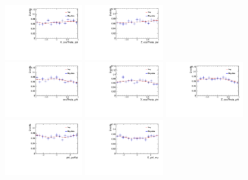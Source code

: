 \begin{figure}[!hbtp]
\includegraphics[width=0.3\textwidth]{Figures/03_Zcs/app_sideband/X_cosTheta_psi.pdf}%
\includegraphics[width=0.3\textwidth]{Figures/03_Zcs/app_sideband/Z_cosTheta_psi.pdf}\\
\includegraphics[width=0.3\textwidth]{Figures/03_Zcs/app_sideband/cosTheta_phi.pdf}%
\includegraphics[width=0.3\textwidth]{Figures/03_Zcs/app_sideband/X_cosTheta_phi.pdf}%
\includegraphics[width=0.3\textwidth]{Figures/03_Zcs/app_sideband/Z_cosTheta_phi.pdf}\\
\includegraphics[width=0.3\textwidth]{Figures/03_Zcs/app_sideband/phi_psiKst.pdf}%
\includegraphics[width=0.3\textwidth]{Figures/03_Zcs/app_sideband/X_phi_mu.pdf}%

\end{figure}
